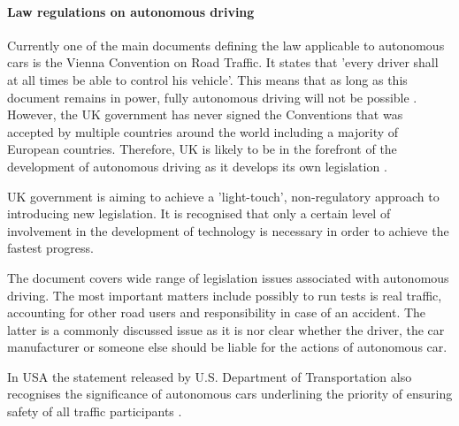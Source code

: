 \documentclass[11pt,english]{article}
\begin{document}
\paragraph{Law regulations on autonomous driving}

\par
Currently one of the main documents defining the law applicable to autonomous cars is the Vienna Convention on Road Traffic. It states that 'every driver shall at all times be able to control his vehicle'. This means that as long as this document remains in power, fully autonomous driving will not be possible \citep{vienna1}. However, the UK government has never signed the Conventions that was accepted by multiple countries around the world including a majority of European countries. Therefore, UK is likely to be in the forefront of the development of autonomous driving as it develops its own legislation \citep{telegraph}.

\par


UK government is aiming to achieve a 'light-touch', non-regulatory approach to introducing new legislation. It is recognised that only a certain level of involvement in the development of technology is necessary in order to achieve the fastest progress.
\par


\par
The \citet{pathwaytodriverless2} document covers wide range of legislation issues associated with autonomous driving. The most important matters include possibly to run tests is real traffic, accounting for other road users and  responsibility in case of an accident. The latter is a commonly discussed issue as it is nor clear whether the driver, the car manufacturer or someone else should be liable for the actions of autonomous car. 

\par
In USA the statement released by U.S. Department of Transportation also recognises the significance of autonomous cars underlining the priority of ensuring safety of all traffic participants \citep{nhtsa1}.
\par



\end{document}
